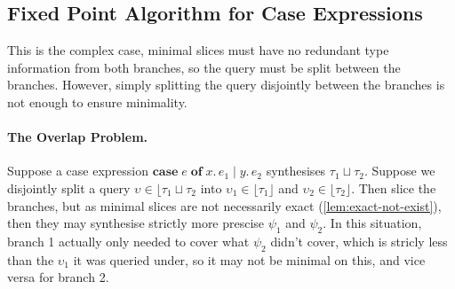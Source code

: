 \subsection{\no Fixed Point Algorithm for Case Expressions}
\label{sec:fixed-point}

\noindent This is the complex case, minimal slices must have no redundant type information from both branches, so the query must be split between the branches. However, simply splitting the query disjointly between the branches is not enough to ensure minimality.

\paragraph{The Overlap Problem.} Suppose a case expression $\mathbf{case}\;e\;\mathbf{of}\;x.\,e_1 \mid y.\,e_2$ synthesises $\tau_1 \sqcup \tau_2$. Suppose we disjointly split a query $\upsilon \in \lfloor \tau_1 \sqcup \tau_2$ into $\upsilon_1 \in \lfloor \tau_1 \rfloor$ and $\upsilon_2 \in \lfloor \tau_2 \rfloor$. Then slice the branches, but as minimal slices are not necessarily exact (\cref{lem:exact-not-exist}), then they may synthesise strictly more prescise $\psi_1$ and $\psi_2$. In this situation, branch 1 actually only needed to cover what $\psi_2$ didn't cover, which is stricly less than the $\upsilon_1$ it was queried under, so it may not be minimal on this, and vice versa for branch 2.
